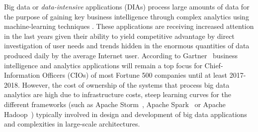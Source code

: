 
Big data or \emph{data-intensive} applications (DIAs) process large amounts of data for the purpose of gaining key business intelligence through complex analytics using machine-learning techniques \cite{bdsurvey,ml4bd}. These applications are receiving increased attention in the last years given their ability to yield competitive advantage by direct investigation of user needs and trends hidden in the enormous quantities of data produced daily by the average Internet user. According to Gartner~\cite{gartner} %
business intelligence and analytics applications will remain a top focus for Chief-Information Officers (CIOs) of most Fortune 500 companies until at least 2017-2018.
However, the cost of ownership of the systems that process big data analytics are high due to infrastructure costs, steep learning curves for the different frameworks (such as Apache Storm~\cite{storm},
Apache Spark~\cite{spark}
or Apache Hadoop~\cite{hadoop}) typically involved in design and development of big data applications
and complexities in large-scale architectures. %

